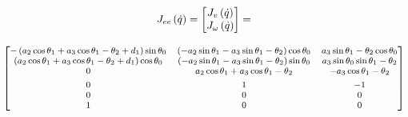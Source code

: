 \begin{gather}\label{eq:j}
        J_{ee}\left(\dot{q}\right) = 
        \begin{bmatrix}
            J_v\left(\dot{q}\right) \\
            J_{\omega}\left(\dot{q}\right)
        \end{bmatrix} = \\[2ex]
        {\footnotesize\begin{bmatrix}
            - \left(a_{2} \cos{\theta_{1}} + a_{3} \cos{\theta_{1} - \theta_{2}} + d_{1}\right) \sin{\theta_{0}} & \left(- a_{2} \sin{\theta_{1}} - a_{3} \sin{\theta_{1} - \theta_{2}}\right) \cos{\theta_{0}} & a_{3} \sin{\theta_{1} - \theta_{2}} \cos{\theta_{0}} \\
            \left(a_{2} \cos{\theta_{1}} + a_{3} \cos{\theta_{1} - \theta_{2}} + d_{1}\right) \cos{\theta_{0}}   & \left(- a_{2} \sin{\theta_{1}} - a_{3} \sin{\theta_{1} - \theta_{2}}\right) \sin{\theta_{0}} & a_{3} \sin{\theta_{0}} \sin{\theta_{1} - \theta_{2}} \\
            0                                                                                                                                              & a_{2} \cos{\theta_{1}} + a_{3} \cos{\theta_{1} - \theta_{2}}                                               & - a_{3} \cos{\theta_{1} - \theta_{2}}                              \\[1ex]
            0                                                                                                                                              & 1                                                                                                                                      & -1                                                                               \\
            0                                                                                                                                              & 0                                                                                                                                      & 0                                                                                \\
            1                                                                                                                                              & 0                                                                                                                                      & 0                                                                                \\
        \end{bmatrix}} \nonumber
\end{gather}


